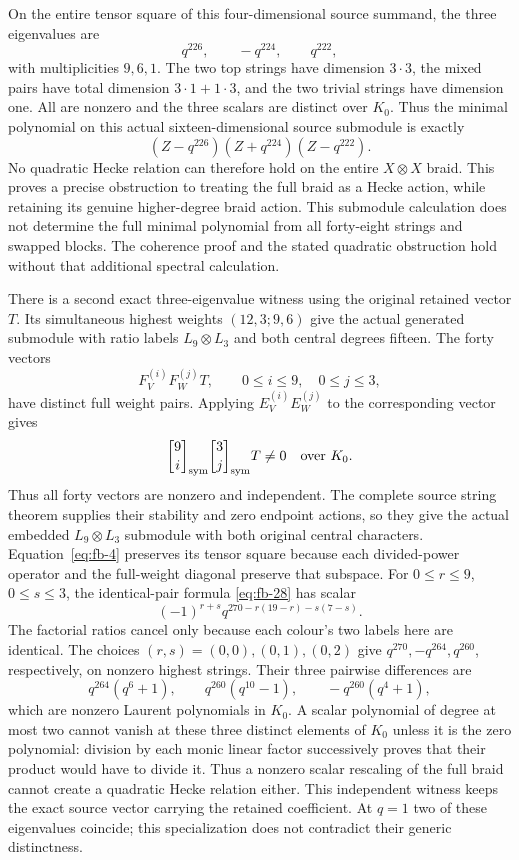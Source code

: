 On the entire tensor square of this four-dimensional source summand,
the three eigenvalues are
\begin{equation}\tag{FB34}\label{eq:fb-34}
q^{226},\qquad -q^{224},\qquad q^{222},
\end{equation}
with multiplicities \(9,6,1\). The two top strings have dimension
\(3\cdot3\), the mixed pairs have total dimension \(3\cdot1+1\cdot3\),
and the two trivial strings have dimension one. All are nonzero and
the three scalars are distinct over \(K_0\). Thus the minimal polynomial
on this actual sixteen-dimensional source submodule is exactly
\begin{equation}\tag{FB35}\label{eq:fb-35}
(Z-q^{226})(Z+q^{224})(Z-q^{222}).
\end{equation}
No quadratic Hecke relation can therefore hold on the entire
\(X\otimes X\) braid. This proves a precise obstruction to treating
the full braid as a Hecke action, while retaining its genuine
higher-degree braid action. This submodule calculation does not determine the full minimal
polynomial from all forty-eight strings and swapped blocks. The
coherence proof and the stated quadratic obstruction hold without
that additional spectral calculation.

There is a second exact three-eigenvalue witness using the original
retained vector \(T\). Its simultaneous highest weights \((12,3;9,6)\)
give the actual generated submodule with ratio labels \(L_9\otimes L_3\)
and both central degrees fifteen. The forty vectors
\[
 F_V^{(i)}F_W^{(j)}T,\qquad 0\le i\le9,\quad0\le j\le3,
\]
have distinct full weight pairs. Applying
\(E_V^{(i)}E_W^{(j)}\) to the corresponding vector gives
\[
 {9\brack i}_{\rm sym}{3\brack j}_{\rm sym}T\ne0
 \quad\hbox{over }K_0.
\]
Thus all forty vectors are nonzero and independent. The complete
source string theorem supplies their stability and zero endpoint
actions, so they give the actual embedded
\(L_9\otimes L_3\) submodule with both original central characters.
Equation~\eqref{eq:fb-4} preserves its tensor square because each
divided-power operator and the full-weight diagonal preserve that
subspace. For \(0\le r\le9\),
\(0\le s\le3\), the identical-pair formula \eqref{eq:fb-28} has scalar
\[
 (-1)^{r+s}q^{270-r(19-r)-s(7-s)}.
\]
The factorial ratios cancel only because each colour's two labels here
are identical. The choices \((r,s)=(0,0),(0,1),(0,2)\) give
\(q^{270},-q^{264},q^{260}\), respectively, on nonzero highest strings.
Their three pairwise differences are
\[
 q^{264}(q^6+1),\qquad q^{260}(q^{10}-1),\qquad
 -q^{260}(q^4+1),
\]
which are nonzero Laurent polynomials in \(K_0\).
A scalar polynomial of degree at most two cannot vanish at these three
distinct elements of \(K_0\) unless it is the zero polynomial: division
by each monic linear factor successively proves that their product
would have to divide it. Thus a nonzero scalar rescaling of the full
braid cannot create a quadratic Hecke relation either. This independent
witness keeps the exact source vector carrying the retained coefficient.
At \(q=1\) two of these eigenvalues coincide; this specialization
does not contradict their generic distinctness.

